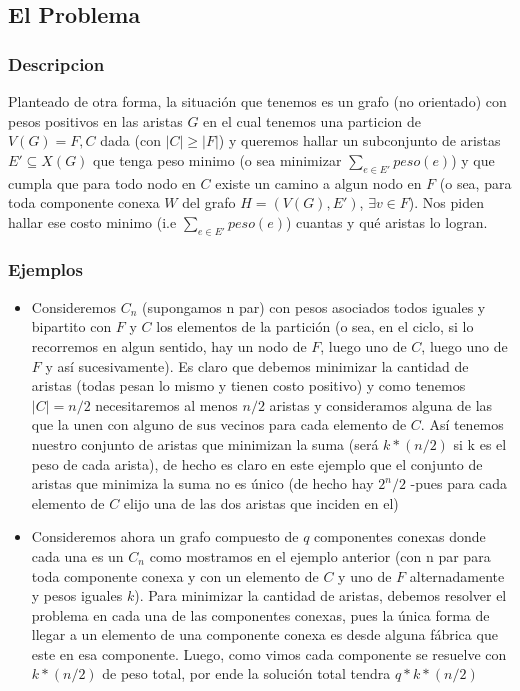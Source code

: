 \documentclass[A4paper,oneside,fleqn,11pt]{article}
\theoremstyle{definition}
\begin{document}
\subsection{El Problema}

\subsubsection{Descripcion}
Planteado de otra forma, la situación que tenemos es un grafo (no orientado) con pesos positivos en las aristas $G$ en el cual tenemos una particion de $V(G)={F,C}$ dada  (con $|C| \geq |F|$) y queremos hallar un subconjunto de aristas $E' \subseteq X(G)$ que tenga peso minimo (o sea minimizar $\sum\limits_{e \in E'} {peso(e)}$) y que cumpla que para todo nodo en $C$ existe un camino a algun nodo en $F$ (o sea, para toda componente conexa $W$ del  grafo $H=(V(G),E')$,  $\exists v \in F$). Nos piden hallar ese costo minimo (i.e $\sum\limits_{e \in E'} {peso(e)}$) cuantas y qué aristas lo logran.
\subsubsection{Ejemplos}

\begin{itemize}
\item Consideremos $C_{n}$ (supongamos n par) con pesos asociados todos iguales y bipartito con $F$ y $C$ los elementos de la partición (o sea, en el ciclo, si lo recorremos en algun sentido, hay un nodo de $F$, luego uno de $C$, luego uno de $F$ y así sucesivamente). Es claro que debemos minimizar la cantidad de aristas (todas pesan lo mismo y tienen costo positivo) y como tenemos $|C|=n/2$ necesitaremos al menos $n/2$ aristas y consideramos alguna de las que la unen con alguno de sus vecinos para cada elemento de $C$. Así tenemos nuestro conjunto de aristas que minimizan la suma (será $k*(n/2)$ si k es el peso de cada arista), de hecho es claro en este ejemplo que el conjunto de aristas que minimiza la suma no es único (de hecho hay $2^n/2$ -pues para cada elemento de $C$ elijo una de las dos aristas que inciden en el)

\item Consideremos ahora un grafo compuesto de $q$ componentes conexas donde cada una es un $C_{n}$ como mostramos en el ejemplo anterior (con n par para toda componente conexa y con un elemento de $C$ y uno de $F$ alternadamente y pesos iguales $k$). Para minimizar la cantidad de aristas, debemos resolver el problema en cada una de las componentes conexas, pues la única forma de llegar a un elemento de una componente conexa es desde alguna fábrica que este en esa componente. Luego, como vimos cada componente se resuelve con $k*(n/2)$ de peso total, por ende la solución total tendra $q*k*(n/2)$
\end{itemize}
\end{document}
